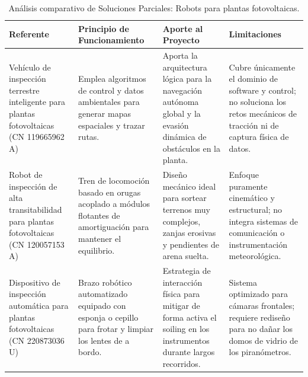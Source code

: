 \documentclass[../../General.tex]{subfiles}
\begin{document}
\begin{table}[H]
	\centering
	\footnotesize
	\caption{Análisis comparativo de Soluciones Parciales: Robots para plantas fotovoltaicas.}
	\label{tab:estado_arte_robots_pv}
	\begin{tabularx}{\textwidth}{|p{3.5cm}|>{\raggedright\arraybackslash}X|>{\raggedright\arraybackslash}X|>{\raggedright\arraybackslash}X|}
		\hline
		\rowcolor[HTML]{D9E1F2} 
		\textbf{Referente} & \textbf{Principio de Funcionamiento} & \textbf{Aporte al Proyecto} & \textbf{Limitaciones} \\ \hline
		Vehículo de inspección terrestre inteligente para plantas fotovoltaicas (CN 119665962 A) & Emplea algoritmos de control y datos ambientales para generar mapas espaciales y trazar rutas. & Aporta la arquitectura lógica para la navegación autónoma global y la evasión dinámica de obstáculos en la planta. & Cubre únicamente el dominio de software y control; no soluciona los retos mecánicos de tracción ni de captura física de datos. \\ \hline
		Robot de inspección de alta transitabilidad para plantas fotovoltaicas (CN 120057153 A) & Tren de locomoción basado en orugas acoplado a módulos flotantes de amortiguación para mantener el equilibrio. & Diseño mecánico ideal para sortear terrenos muy complejos, zanjas erosivas y pendientes de arena suelta. & Enfoque puramente cinemático y estructural; no integra sistemas de comunicación o instrumentación meteorológica. \\ \hline
		Dispositivo de inspección automática para plantas fotovoltaicas (CN 220873036 U) & Brazo robótico automatizado equipado con esponja o cepillo para frotar y limpiar los lentes de a bordo. & Estrategia de interacción física para mitigar de forma activa el soiling en los instrumentos durante largos recorridos. & Sistema optimizado para cámaras frontales; requiere rediseño para no dañar los domos de vidrio de los piranómetros. \\ \hline
	\end{tabularx}
\end{table}
\end{document}
